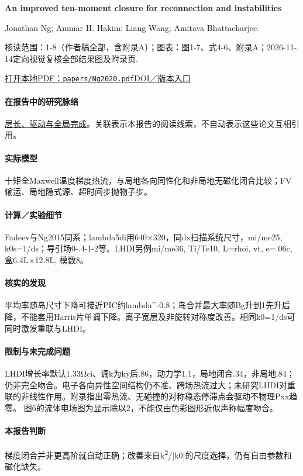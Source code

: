 \textbf{An improved ten-moment closure for reconnection and instabilities}\citep{Ng2020}\

Jonathan Ng;  Ammar H. Hakim;  Liang Wang;  Amitava Bhattacharjee.

\textsf{核读范围：}1-8（作者稿全部，含附录A）；\textsf{图表：}图1-7、式4-6、附录A；2026-11-14定向视觉复核全部结果图及附录页.

\href{run:papers/Ng2020.pdf}{打开本地PDF：\texttt{papers/Ng2020.pdf}}\quad\href{https://doi.org/10.1063/5.0012067}{DOI／版本入口}

\paragraph{在报告中的研究脉络}\hyperref[story:global]{层长、驱动与全局完成}。关联表示本报告的阅读线索，不自动表示这些论文互相引用。

\paragraph{实际模型}十矩全Maxwell温度梯度热流，与局地各向同性化和非局地无磁化闭合比较；FV输运、局地隐式源、超时间步抛物子步。

\paragraph{计算／实验细节}Fadeev与Ng2015同系；lambda5di用640×320，同dx扫描系统尺寸，mi/me25, k0s=1/ds；导引场0-.4-1-2等。LHDI另例mi/me36, Ti/Te10, L=rhoi, vt, e=.06c, 盒6.4L×12.8L, 模数8。

\paragraph{核实的发现}平均率随岛尺寸下降可接近PIC约lambda\textasciicircum{}-0.8；岛合并最大率随Bg升到1先升后降，不能套用Harris片单调下降。离子宽层及非旋转对称度改善。相同k0=1/ds可同时激发重联与LHDI。

\paragraph{限制与未完成问题}LHDI增长率默认1.33Ωci、调k为ky后.86，动力学1.1，局地闭合.34，非局地.84；仍非完全吻合。电子各向异性空间结构仍不准、跨场热流过大；未研究LHDI对重联的非线性作用。附录指出零热流、无碰撞的对称稳态停滞点会驱动不物理Pxx趋零。 图6的流体电场图为显示除以2，不能仅由色彩图形近似声称幅度吻合。

\paragraph{本报告判断}梯度闭合并非更高阶就自动正确；改善来自k\textsuperscript{2}/|k0|的尺度选择，仍有自由参数和磁化缺失。

